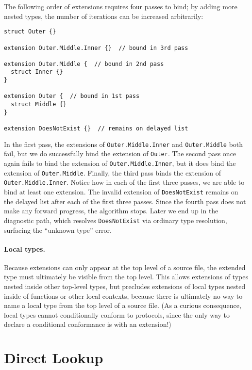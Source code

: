 \documentclass[../generics]{subfiles}
\begin{document}
\begin{example}
The following order of extensions requires four passes to bind; by adding more nested types, the number of iterations can be increased arbitrarily:
\begin{Verbatim}
struct Outer {}

extension Outer.Middle.Inner {}  // bound in 3rd pass

extension Outer.Middle {  // bound in 2nd pass
  struct Inner {}
}

extension Outer {  // bound in 1st pass
  struct Middle {}
}

extension DoesNotExist {}  // remains on delayed list
\end{Verbatim}

In the first pass, the extensions of \texttt{Outer.Middle.Inner} and \texttt{Outer.Middle} both fail, but we do successfully bind the extension of \texttt{Outer}. The second pass once again fails to bind the extension of \texttt{Outer.Middle.Inner}, but it does bind the extension of \texttt{Outer.Middle}. Finally, the third pass binds the extension of \texttt{Outer.Middle.Inner}. Notice how in each of the first three passes, we are able to bind at least one extension. The invalid extension of \texttt{DoesNotExist} remains on the delayed list after each of the first three passes. Since the fourth pass does not make any forward progress, the algorithm stops. Later we end up in the diagnostic path, which resolves \texttt{DoesNotExist} via ordinary type resolution, surfacing the ``unknown type'' error.
\end{example}

\paragraph{Local types.}
Because extensions can only appear at the top level of a source file, the extended type must ultimately be visible from the top level. This allows extensions of types nested inside other top-level types, but precludes extensions of local types nested inside of functions or other local contexts, because there is ultimately no way to name a local type from the top level of a source file. (As a curious consequence, local types cannot conditionally conform to protocols, since the only way to declare a conditional conformance is with an extension!)

\section{Direct Lookup}
\end{document}
